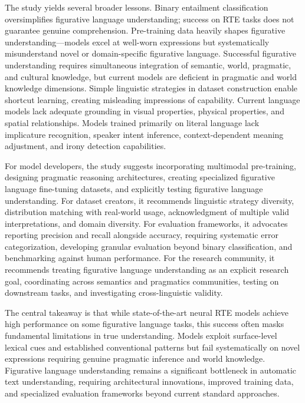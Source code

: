 \documentclass[12pt]{article}
\begin{document}
The study yields several broader lessons. Binary entailment classification oversimplifies figurative language understanding; success on RTE tasks does not guarantee genuine comprehension. Pre-training data heavily shapes figurative understanding---models excel at well-worn expressions but systematically misunderstand novel or domain-specific figurative language. Successful figurative understanding requires simultaneous integration of semantic, world, pragmatic, and cultural knowledge, but current models are deficient in pragmatic and world knowledge dimensions. Simple linguistic strategies in dataset construction enable shortcut learning, creating misleading impressions of capability. Current language models lack adequate grounding in visual properties, physical properties, and spatial relationships. Models trained primarily on literal language lack implicature recognition, speaker intent inference, context-dependent meaning adjustment, and irony detection capabilities.

For model developers, the study suggests incorporating multimodal pre-training, designing pragmatic reasoning architectures, creating specialized figurative language fine-tuning datasets, and explicitly testing figurative language understanding. For dataset creators, it recommends linguistic strategy diversity, distribution matching with real-world usage, acknowledgment of multiple valid interpretations, and domain diversity. For evaluation frameworks, it advocates reporting precision and recall alongside accuracy, requiring systematic error categorization, developing granular evaluation beyond binary classification, and benchmarking against human performance. For the research community, it recommends treating figurative language understanding as an explicit research goal, coordinating across semantics and pragmatics communities, testing on downstream tasks, and investigating cross-linguistic validity.

The central takeaway is that while state-of-the-art neural RTE models achieve high performance on some figurative language tasks, this success often masks fundamental limitations in true understanding. Models exploit surface-level lexical cues and established conventional patterns but fail systematically on novel expressions requiring genuine pragmatic inference and world knowledge. Figurative language understanding remains a significant bottleneck in automatic text understanding, requiring architectural innovations, improved training data, and specialized evaluation frameworks beyond current standard approaches.
\end{document}
